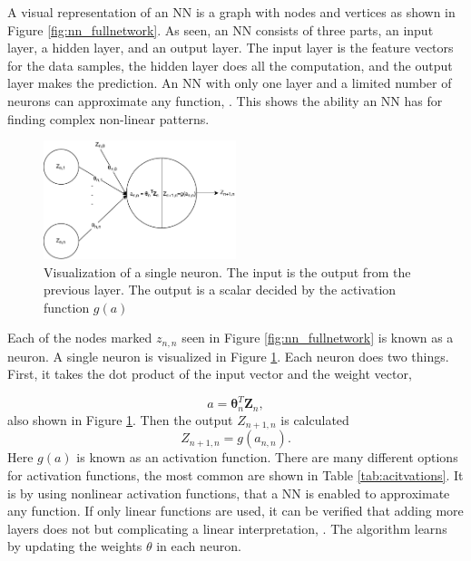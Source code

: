         A visual representation of an NN is a graph with nodes and vertices as shown in Figure \ref{fig:nn_fullnetwork}. As seen, an NN consists of three parts, an input layer, a hidden layer, and an output layer. The input layer is the feature vectors for the data samples, the hidden layer does all the computation, and the output layer makes the prediction. An NN with only one layer and a limited number of neurons can approximate any function, \cite{Hastie}. This shows the ability an NN has for finding complex non-linear patterns.
        
        
        \begin{figure}[h]
            \centering
            \includegraphics[width=0.5\textwidth]{report/figures/techniques/single_neuron.pdf}
            \caption{Visualization of a single neuron. The input is the output from the previous layer. The output is a scalar decided by the activation function $g(a)$}
            \label{fig:nn_neuron}
        \end{figure}
        
        Each of the nodes marked  $z_{n,n}$ seen in Figure \ref{fig:nn_fullnetwork} is known as a neuron. A single neuron is visualized in Figure \ref{fig:nn_neuron}. Each neuron does two things. First, it takes the dot product of the input vector and the weight vector, 
        
        \begin{equation}
            a = \bm \theta_n^T \bm Z_n,
            \label{eq:neuron_a}
        \end{equation}
        also shown in Figure \ref{fig:nn_neuron}. Then the output $Z_{n+1,n}$ is calculated 
        \begin{equation}
            Z_{n+1,n} = g(a_{n,n}).
            \label{eq:nn_activation}
        \end{equation}
        Here $g(a)$ is known as an activation function. There are many different options for activation functions, the most common are shown in Table \ref{tab:acitvations}. It is by using nonlinear activation functions, that a NN is enabled to approximate any function. If only linear functions are used, it can be verified that adding more layers does not but complicating a linear interpretation, \cite{Hastie}. The algorithm learns by updating the weights $\theta$ in each neuron.  
        
